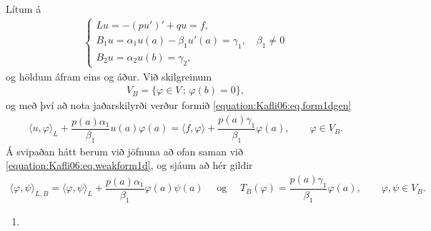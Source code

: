 \documentclass[a4paper,10pt,icelandic]{sphinxmanual}
\begin{document}
Lítum á
\begin{equation*}
\begin{split}\begin{cases}
Lu=-(pu')'+qu=f, \\
B_1u={\alpha}_1u(a)-\beta_1u'(a)=\gamma_1, \quad \beta_1\neq 0 \\
B_2u=\alpha_2u(b)=\gamma_2,
\end{cases}\end{split}
\end{equation*}
og höldum áfram eins og áður. Við skilgreinum
\begin{equation*}
\begin{split}V_B=\{\varphi\in V \,;\, \varphi(b)=0 \},\end{split}
\end{equation*}
og með því að nota jaðarskilyrði verður formið \eqref{equation:Kafli06:eq.form1dgen}
\begin{equation*}
\begin{split}{{\langle u,\varphi\rangle}}_L
+\dfrac {p(a)\alpha_1}{\beta_1}u(a)\varphi(a)
={{\langle f,\varphi\rangle}}
+\dfrac {p(a)\gamma_1}{\beta_1}\varphi(a), \qquad \varphi\in V_B.\end{split}
\end{equation*}
Á svipaðan hátt berum við jöfnuna að ofan saman við \eqref{equation:Kafli06:eq.weakform1d}, og sjáum að hér gildir
\begin{equation*}
\begin{split}{{\langle \varphi,\psi\rangle}}_{L,B}={{\langle \varphi,\psi\rangle}}_L
+\dfrac {p(a)\alpha_1}{\beta_1}\varphi(a)\psi(a)
\quad \text{ og } \quad
T_B(\varphi)=\dfrac {p(a)\gamma_1}{\beta_1}\varphi(a),
\qquad \varphi,\psi\in V_B.\end{split}
\end{equation*}\begin{enumerate}
\def\theenumi{\Roman{enumi}}
\def\labelenumi{\theenumi .}
\makeatletter\def\p@enumii{\p@enumi \theenumi .}\makeatother
\setcounter{enumi}{3}
\item {} 

\end{enumerate}
\end{document}
